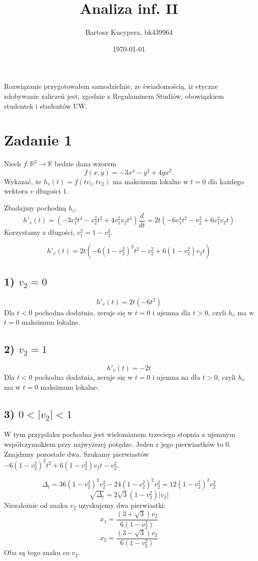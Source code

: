 \documentclass{article}
\title{Analiza inf. II}
\author{Bartosz Kucypera, bk439964}
\date{\today}
\def\vv{v_2^2}
\begin{document}
\maketitle

Rozwiązanie przygotowałem samodzielnie, ze świadomością, iż etyczne zdobywanie zaliczeń jest, zgodnie z Regulaminem Studiów, obowiązkiem studentek i studentów UW.

\section*{Zadanie 1}
Niech $f:\mathbb{R}^2 \to \mathbb{R}$ bedzie dana wzorem
$$f(x,y)=-3x^4-y^2+4yx^2.$$
Wykazać, że $h_v(t) = f(tv_1,tv_2)$ ma maksimum lokalne w $t=0$ dla każdego wektora $v$ długości $1$.

Zbadajmy pochodną $h_v$.
$$h'_v(t) = \left(-3v_1^4t^4-v_2^2t^2+4v_1^2v_2t^3 \right)\frac{d}{dt} = 
2t(-6v_1^4t^2-v_2^2+6v_1^2v_2t)$$
Korzystamy z długości, $ v_1^2 = 1-v_2^2 $.

$$h'_v(t) = 2t(-6(1-v_2^2)^2t^2-v_2^2+6(1-v_2^2)v_2t) $$
\subsection*{1) $v_2=0$}
$$h'_v(t) = 2t(-6t^2) $$
Dla $t<0$ pochodna dodatnia, zeruje się w $t=0$ i ujemna dla $t>0$, czyli $h_v$ ma w $t=0$ maksimum lokalne.
\subsection*{2) $v_2=1$}

$$h'_v(t) = -2t $$
Dla $t<0$ pochodna dodatnia, zeruje się w $t=0$ i ujemna na dla $t>0$, czyli $h_v$ ma w $t=0$ maksimum lokalne.

\subsection*{3) $0<|v_2|<1$}
W tym przypdaku pochodna jest wielomianem trzeciego stopnia z ujemnym współczynnikiem przy najwyższej potędze. Jeden z jego pierwiastków to 0. Znajdzmy pozostałe dwa. \newline 
Szukamy pierwiastów $-6(1-v_2^2)^2t^2 + 6(1-v_2^2)v_2t -v_2^2$.


$$ \Delta_t = 36(1-\vv)^2\vv -24(1-\vv)^2\vv = 12(1-\vv)^2\vv $$
$$\sqrt{\Delta_t} = 2\sqrt{3}(1-v_2^2)|v_2|$$
Niezależnie od znaku $v_2$ uzyskujemy dwa pierwiastki:
$$ x_1 = \frac{(3+\sqrt{3})v_2}{6(1-\vv)} $$
$$ x_2 = \frac{(3-\sqrt{3})v_2}{6(1-\vv)} $$
Oba są tego znaku co $v_2$.
\end{document}
